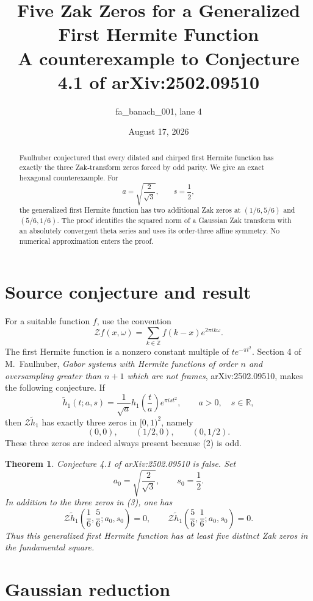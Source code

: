 \documentclass[11pt]{article}
\title{Five Zak Zeros for a Generalized First Hermite Function\\
\large A counterexample to Conjecture 4.1 of arXiv:2502.09510}
\author{fa\_banach\_001, lane 4}
\date{August 17, 2026}
\newtheorem{theorem}{Theorem}
\newcommand{\cZ}{\mathcal Z}
\newcommand{\R}{\mathbb R}
\newcommand{\Z}{\mathbb Z}
\begin{document}
\maketitle

\begin{abstract}
Faulhuber conjectured that every dilated and chirped first Hermite function
has exactly the three Zak-transform zeros forced by odd parity.  We give an
exact hexagonal counterexample.  For
\[
 a=\sqrt{\frac{2}{\sqrt3}},\qquad s=\frac12,
\]
the generalized first Hermite function has two additional Zak zeros at
\((1/6,5/6)\) and \((5/6,1/6)\).  The proof identifies the squared norm of a
Gaussian Zak transform with an absolutely convergent theta series and uses
its order-three affine symmetry.  No numerical approximation enters the
proof.
\end{abstract}

\section{Source conjecture and result}

For a suitable function \(f\), use the convention
\[
 \cZ f(x,\omega)=\sum_{k\in\Z}f(k-x)e^{2\pi i k\omega}.
 \tag{1}
\]
The first Hermite function is a nonzero constant multiple of
\(t e^{-\pi t^2}\).  Section 4 of M.~Faulhuber,
\emph{Gabor systems with Hermite functions of order \(n\) and oversampling
greater than \(n+1\) which are not frames}, arXiv:2502.09510, makes the
following conjecture.  If
\[
 \widetilde h_1(t;a,s)
 =\frac1{\sqrt a}h_1\!\left(\frac ta\right)e^{\pi i s t^2},
 \qquad a>0,\quad s\in\R,
 \tag{2}
\]
then \(\cZ\widetilde h_1\) has exactly three zeros in \([0,1)^2\), namely
\[
 (0,0),\qquad (1/2,0),\qquad (0,1/2).
 \tag{3}
\]
These three zeros are indeed always present because (2) is odd.

\begin{theorem}\label{thm:main}
Conjecture 4.1 of arXiv:2502.09510 is false.  Set
\[
 a_0=\sqrt{\frac{2}{\sqrt3}},\qquad s_0=\frac12.
 \tag{4}
\]
In addition to the three zeros in \emph{(3)}, one has
\[
 \cZ\widetilde h_1\!\left(\frac16,\frac56;a_0,s_0\right)=0,
 \qquad
 \cZ\widetilde h_1\!\left(\frac56,\frac16;a_0,s_0\right)=0.
 \tag{5}
\]
Thus this generalized first Hermite function has at least five distinct Zak
zeros in the fundamental square.
\end{theorem}

\section{Gaussian reduction}
\end{document}
